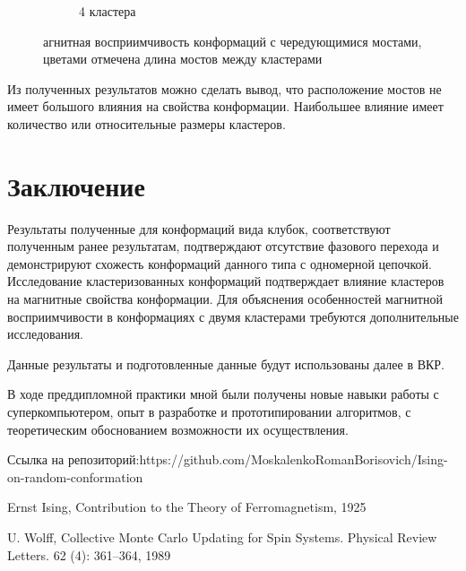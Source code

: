 \documentclass[14pt]{extarticle}
\begin{document}
\begin{figure}[ht]
\begin{subfigure}[t]{0.3\textwidth}
        \caption*{4 кластера}
    \end{subfigure}
	\caption{агнитная восприимчивость конформаций с чередующимися мостами, цветами отмечена длина мостов между кластерами}
	\label{fig:cluster_ud_magnetc_sus}
\end{figure}

Из полученных результатов можно сделать вывод, что расположение мостов не имеет большого влияния на свойства конформации. Наибольшее влияние имеет количество или относительные размеры кластеров.


\section{Заключение}
Результаты полученные для конформаций вида клубок, соответствуют полученным ранее результатам, подтверждают отсутствие фазового перехода и демонстрируют схожесть конформаций данного типа с одномерной цепочкой. Исследование кластеризованных конформаций подтверждает влияние кластеров на магнитные свойства конформации. Для объяснения особенностей магнитной восприимчивости в конформациях с двумя кластерами требуются дополнительные исследования. 

Данные результаты и подготовленные данные будут использованы далее в ВКР.

В ходе преддипломной практики мной были получены новые навыки работы с суперкомпьютером, опыт в разработке и прототипировании алгоритмов, с теоретическим обоснованием возможности их осуществления.

\begin{thebibliography}{9}
 Ссылка на репозиторий:https://github.com/MoskalenkoRomanBorisovich/Ising-on-random-conformation 
 
Ernst Ising, Contribution to the Theory of Ferromagnetism, 1925


 U. Wolff, Collective Monte Carlo Updating for Spin Systems. Physical Review Letters. 62 (4): 361–364, 1989
 
\end{thebibliography}
\end{document}

